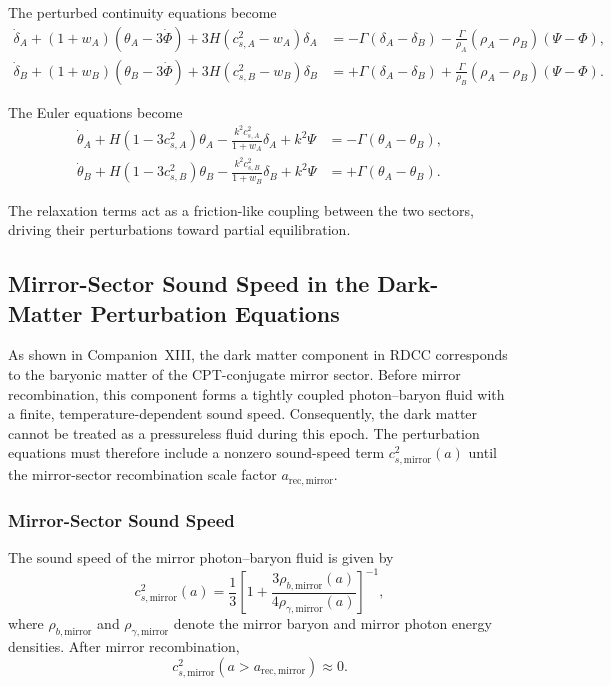 \documentclass[11pt,a4paper]{article}
\begin{document}
The perturbed continuity equations become
\begin{align}
\dot{\delta}_A + (1+w_A)(\theta_A - 3\dot{\Phi})
+ 3H(c_{s,A}^2 - w_A)\delta_A
&= -\Gamma(\delta_A - \delta_B)
- \frac{\Gamma}{\rho_A}(\rho_A - \rho_B)(\Psi - \Phi), \\
\dot{\delta}_B + (1+w_B)(\theta_B - 3\dot{\Phi})
+ 3H(c_{s,B}^2 - w_B)\delta_B
&= +\Gamma(\delta_A - \delta_B)
+ \frac{\Gamma}{\rho_B}(\rho_A - \rho_B)(\Psi - \Phi).
\end{align}

The Euler equations become
\begin{align}
\dot{\theta}_A + H(1 - 3c_{s,A}^2)\theta_A
- \frac{k^2 c_{s,A}^2}{1+w_A}\delta_A + k^2\Psi
&= -\Gamma(\theta_A - \theta_B), \\
\dot{\theta}_B + H(1 - 3c_{s,B}^2)\theta_B
- \frac{k^2 c_{s,B}^2}{1+w_B}\delta_B + k^2\Psi
&= +\Gamma(\theta_A - \theta_B).
\end{align}

The relaxation terms act as a friction-like coupling between the two sectors, driving their perturbations toward partial equilibration.

\subsection{Mirror-Sector Sound Speed in the Dark-Matter Perturbation Equations}
\label{sec:mirror-sound-speed-class}

As shown in Companion~XIII, the dark matter component in RDCC corresponds to the
baryonic matter of the CPT-conjugate mirror sector. Before mirror recombination, this
component forms a tightly coupled photon--baryon fluid with a finite, temperature-dependent
sound speed. Consequently, the dark matter cannot be treated as a pressureless fluid during
this epoch. The perturbation equations must therefore include a nonzero sound-speed term
$c_{s,\mathrm{mirror}}^{2}(a)$ until the mirror-sector recombination scale factor
$a_{\mathrm{rec,mirror}}$.

\subsubsection{Mirror-Sector Sound Speed}

The sound speed of the mirror photon--baryon fluid is given by
\begin{equation}
c_{s,\mathrm{mirror}}^{2}(a)
=
\frac{1}{3}
\left[
1
+
\frac{3\rho_{b,\mathrm{mirror}}(a)}{4\rho_{\gamma,\mathrm{mirror}}(a)}
\right]^{-1},
\label{eq:cs-mirror}
\end{equation}
where $\rho_{b,\mathrm{mirror}}$ and $\rho_{\gamma,\mathrm{mirror}}$ denote the mirror baryon and
mirror photon energy densities. After mirror recombination,
\begin{equation}
c_{s,\mathrm{mirror}}^{2}(a > a_{\mathrm{rec,mirror}}) \approx 0.
\end{equation}
\end{document}
